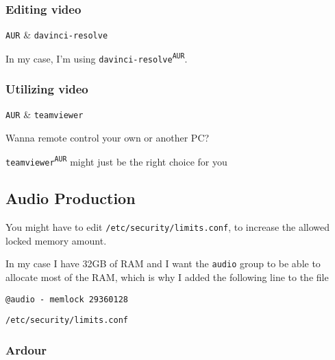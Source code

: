 \documentclass[10pt]{dustdoc}
\begin{document}
\subsubsection{Editing video}%
\label{sec:editing-video}

\begin{pkgtable}
    \texttt{AUR} & \texttt{davinci-resolve} \\
\end{pkgtable}

In my case, I’m using \texttt{davinci-resolve\textsuperscript{\texttt{AUR}}}.

\subsubsection{Utilizing video}%
\label{sec:utilizing-video}

\begin{pkgtable}
    \texttt{AUR} & \texttt{teamviewer} \\
\end{pkgtable}

Wanna remote control your own or another PC?\@

\texttt{teamviewer\textsuperscript{\texttt{AUR}}} might just be the right choice for you

\subsection{Audio Production}%
\label{sec:audio-production}

You might have to edit \texttt{/etc/security/limits.conf}, to increase the allowed locked memory amount.

In my case I have 32GB of RAM and I want the \texttt{audio} group to be able to allocate most of the RAM, which is why I added the following line to the file

\begin{mintedlisting}
    \begin{verbatim}
@audio - memlock 29360128
    \end{verbatim}

    \caption{\texttt{/etc/security/limits.conf}}
\end{mintedlisting}

\subsubsection{Ardour}%
\label{sec:ardour}
\end{document}
